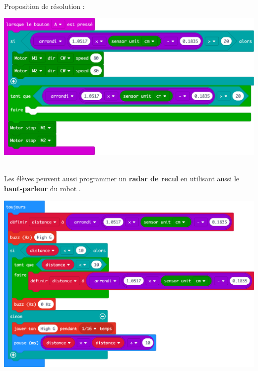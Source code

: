 \begin{minipage}[t]{0.5\linewidth}
    \begin{methode}~\\
    Proposition de résolution :
    
    \includegraphics[width=\linewidth]
    {res/maqueen-fiche1-30.png}
    
    \end{methode}
\end{minipage}
\hfill
\begin{minipage}[t]{0.5\linewidth}
    \begin{remarque}~\\
    Les élèves peuvent aussi programmer un \textbf{radar de recul} en utilisant aussi le \textbf{haut-parleur} du robot \mq.
    
    \includegraphics[width=\linewidth]
    {res/maqueen-fiche1-31.png}
    
    
    \end{remarque}
\end{minipage}